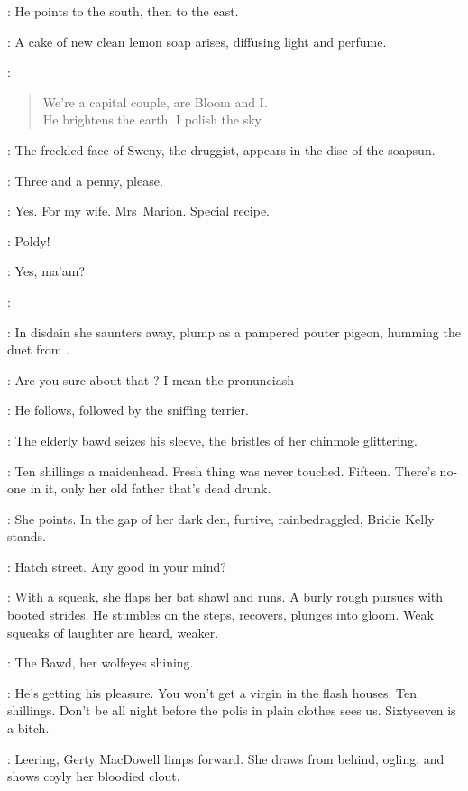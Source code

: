 :
He points to the south,
then to the east.

:
A cake of new clean lemon soap arises,
diffusing light and perfume.

\Soap:
\begin{verse}
    We're a capital couple,
are Bloom and I.\\
    He brightens the earth.
I polish the sky.
\end{verse}

:
The freckled face of Sweny,
the druggist,
appears in the disc of the soapsun.

\Sweny:
Three and a penny,
please.

\Bloom:
Yes.
For my wife.
Mrs~Marion.
Special recipe.

\Marion:
 Poldy!

\Bloom:
Yes,
ma'am?

\Marion:

:
In disdain she saunters away,
plump as a pampered pouter pigeon,
humming the duet from .

\Bloom:
Are you sure about that ?
I mean the pronunciash---

:
He follows,
followed by the sniffing terrier.

:
The elderly bawd seizes his sleeve,
the bristles of her chinmole glittering.

\Bawd:
Ten shillings a maidenhead.
Fresh thing was never touched.
Fifteen.
There's no-one in it,
only her old father that's dead drunk.

:
She points.
In the gap of her dark den,
furtive,
rainbedraggled,
Bridie Kelly stands.

\Bridie:
Hatch street.
Any good in your mind?

:
With a squeak,
she flaps her bat shawl and runs.
A burly rough pursues with booted strides.
He stumbles on the steps,
recovers,
plunges into gloom.
Weak squeaks of laughter are heard,
weaker.

:
The Bawd,
her wolfeyes shining.

\Bawd:
He's getting his pleasure.
You won't get a virgin in the flash houses.
Ten shillings.
Don't be all night before the polis in plain clothes sees us.
Sixtyseven is a bitch.

:
Leering,
Gerty MacDowell limps forward.
She draws from behind,
ogling,
and shows coyly her bloodied clout.

